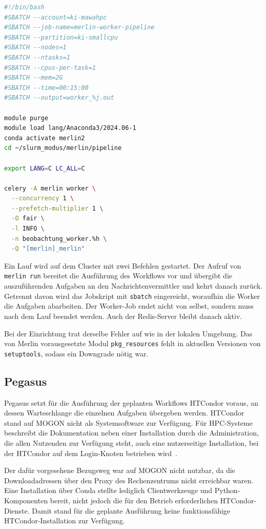 \begin{lstlisting}[language=bash,
  caption={Jobskript zum Start der Merlin-Worker im regulären Slurm-Betrieb auf MOGON},
  label={lst:mogon:merlinjob}]
#!/bin/bash
#SBATCH --account=ki-mawahpc
#SBATCH --job-name=merlin-worker-pipeline
#SBATCH --partition=ki-smallcpu
#SBATCH --nodes=1
#SBATCH --ntasks=1
#SBATCH --cpus-per-task=1
#SBATCH --mem=2G
#SBATCH --time=00:15:00
#SBATCH --output=worker_%j.out

module purge
module load lang/Anaconda3/2024.06-1
conda activate merlin2
cd ~/slurm_modus/merlin/pipeline

export LANG=C LC_ALL=C

celery -A merlin worker \
  --concurrency 1 \
  --prefetch-multiplier 1 \
  -O fair \
  -l INFO \
  -n beobachtung_worker.%h \
  -Q "[merlin]_merlin"
\end{lstlisting}

Ein Lauf wird auf dem Cluster mit zwei Befehlen gestartet. Der Aufruf von \texttt{merlin run} bereitet die Ausführung des
Workflows vor und übergibt die auszuführenden Aufgaben an den
Nachrichtenvermittler und kehrt danach zurück. Getrennt
davon wird das Jobskript mit \texttt{sbatch} eingereicht, woraufhin
die Worker die Aufgaben abarbeiten. Der Worker-Job endet nicht von
selbst, sondern muss nach dem Lauf beendet werden. Auch der
Redis-Server bleibt danach aktiv. 

Bei der Einrichtung trat derselbe Fehler auf wie in der lokalen Umgebung. Das von Merlin vorausgesetzte Modul \texttt{pkg\_resources} fehlt in aktuellen
Versionen von \texttt{setuptools}, sodass ein Downgrade nötig war.


\subsection{Pegasus}
\label{sec:mogon:pegasus}

Pegasus setzt für die Ausführung der geplanten Workflows HTCondor
voraus, an dessen Warteschlange die einzelnen Aufgaben übergeben
werden. HTCondor stand auf MOGON nicht als Systemsoftware zur Verfügung.
Für HPC-Systeme beschreibt die Dokumentation neben einer
Installation durch die Administration, die allen Nutzenden zur
Verfügung steht, auch eine nutzerseitige Installation, bei der
HTCondor auf dem Login-Knoten betrieben wird~\cite{pegasusdocs}.

Der dafür vorgesehene Bezugsweg war auf MOGON nicht nutzbar, da die
Downloadadressen über den Proxy des Rechenzentrums nicht erreichbar
waren. Eine Installation über Conda stellte lediglich
Clientwerkzeuge und Python-Komponenten bereit, nicht jedoch die für
den Betrieb erforderlichen HTCondor-Dienste. Damit stand für die
geplante Ausführung keine funktionsfähige HTCondor-Installation zur
Verfügung.

